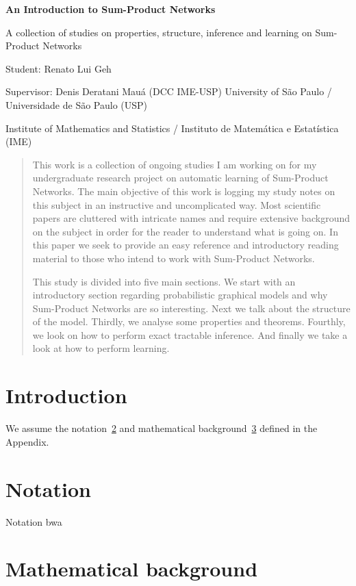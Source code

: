 \documentclass[a4paper,10pt]{article}
\theoremstyle{plain}
\begin{document}
\begin{titlepage}
  \begin{center}
    \LARGE
    \textbf{An Introduction to Sum-Product Networks}

    \vspace{1.7cm}
    \Large
    A collection of studies on properties, structure, inference and learning on Sum-Product
    Networks

    \vspace{1.7cm}
    \large
    Student: Renato Lui Geh

    Supervisor: Denis Deratani Mauá (DCC IME-USP)
    \vfill
    \large
    University of São Paulo / Universidade de São Paulo (USP)

    Institute of Mathematics and Statistics / Instituto de Matemática e Estatística (IME)
    \vspace{1.5cm}
  \end{center}
\end{titlepage}

\newpage
\null\vspace{\fill}
\begin{abstract}
  \large
  This work is a collection of ongoing studies I am working on for my undergraduate research
  project on automatic learning of Sum-Product Networks. The main objective of this work is logging
  my study notes on this subject in an instructive and uncomplicated way. Most scientific papers
  are cluttered with intricate names and require extensive background on the subject in order for
  the reader to understand what is going on. In this paper we seek to provide an easy reference and
  introductory reading material to those who intend to work with Sum-Product Networks.

  This study is divided into five main sections. We start with an introductory section regarding
  probabilistic graphical models and why Sum-Product Networks are so interesting. Next we talk
  about the structure of the model. Thirdly, we analyse some properties and theorems. Fourthly, we
  look on how to perform exact tractable inference. And finally we take a look at how to perform
  learning.
\end{abstract}
\vspace{\fill}
\newpage
\large
\tableofcontents
\normalsize
\newpage

\section{Introduction}

We assume the notation~\ref{app:not} and mathematical background~\ref{app:bak} defined in the
Appendix.

\newpage
\begin{appendices}
  \section{Notation}\label{app:not}
  Notation bwa
  \section{Mathematical background}\label{app:bak}
\end{appendices}

\printbibliography{}
\end{document}
